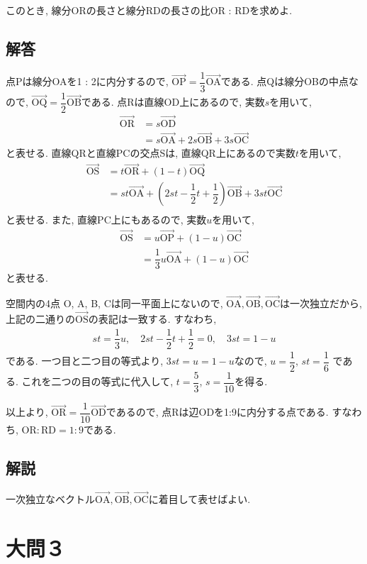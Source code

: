 \documentclass[dvipdfmx,a4paper]{jsarticle}
\newcommand{\posv}[1]{\overrightarrow{\mathrm{#1}}}
\newcommand{\2}{I\hspace{-1pt}I}
\newcommand{\3}{I\hspace{-1pt}I\hspace{-1pt}I}
\begin{document}
    このとき, 線分ORの長さと線分RDの長さの比OR : RDを求めよ. 
    \subsection{解答}
    点Pは線分OAを1 : 2に内分するので, $\posv{OP} = \dfrac{1}{3}\posv{OA}$である. 
    点Qは線分OBの中点なので, $\posv{OQ} = \dfrac{1}{2}\posv{OB}$である. 
    点Rは直線OD上にあるので, 実数$s$を用いて, 
    \begin{align*}
        \posv{OR} &= s \posv{OD} \\
        &= s\posv{OA} + 2s\posv{OB} + 3s\posv{OC}
    \end{align*}
    と表せる. 直線QRと直線PCの交点Sは, 直線QR上にあるので実数$t$を用いて, 
    \begin{align*}
        \posv{OS} &= t \posv{OR} + (1-t) \posv{OQ}\\
        &= st\posv{OA} + \left(2st-\dfrac{1}{2}t+\dfrac{1}{2}\right)\posv{OB} + 3st\posv{OC} \\
    \end{align*}
    と表せる. また, 直線PC上にもあるので, 実数$u$を用いて, 
    \begin{align*}
        \posv{OS} &= u \posv{OP} + (1-u) \posv{OC}\\
        &= \dfrac{1}{3}u \posv{OA} + (1-u) \posv{OC}
    \end{align*}
    と表せる. 
    
    空間内の4点 O, A, B, Cは同一平面上にないので, $\posv{OA},\posv{OB},\posv{OC}$は一次独立だから, 
    上記の二通りの$\posv{OS}$の表記は一致する. すなわち, 
    \begin{align*}
        st = \dfrac{1}{3}u, \quad 2st-\dfrac{1}{2}t+\dfrac{1}{2} = 0, \quad 3st = 1-u
    \end{align*}
    である. 一つ目と二つ目の等式より, $3st=u=1-u$なので, $u = \dfrac{1}{2}$, $st = \dfrac{1}{6}$
    である. これを二つの目の等式に代入して, $t = \dfrac{5}{3}$, $s = \dfrac{1}{10}$を得る. 

    以上より, $\posv{OR} =  \dfrac{1}{10}\posv{OD}$であるので, 点Rは辺ODを1:9に内分する点である. 
    すなわち, $\mathrm{OR} : \mathrm{RD} = 1:9$である. 

    \subsection{解説}
    一次独立なベクトル$\posv{OA},\posv{OB},\posv{OC}$に着目して表せばよい. 

    \section{大問３}
\end{document}
